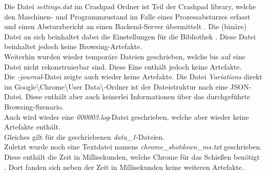 \begin{appendices}

Die Datei \textit{settings.dat} im Crashpad Ordner ist Teil der Crashpad library, welche den Maschinen- und Programmzustand im Falle eines Prozessabsturzes erfasst und einen Absturzbericht an einen Backend-Server übermittelt \cite{CrashpadOverviewDesign}. Die (binäre) Datei an sich beinhaltet dabei die Einstellungen für die Bibliothek \cite{CrashpadOverviewDesign}. Diese Datei beinhaltet jedoch keine Browsing-Artefakte. \\
Weiterhin wurden wieder temporäre Dateien geschrieben, welche bis auf eine Datei nicht rekonstruierbar sind. Diese Eine enthält jedoch keine Artefakte. \\
Die \textit{-journal}-Datei zeigte auch wieder keine Artefakte.
Die Datei \textit{Variations} direkt im Google\textbackslash{}Chrome\textbackslash{}User Data\textbackslash{}-Ordner ist der Dateistruktur nach eine JSON-Datei. Diese enthält aber auch keinerlei Informationen über das durchgeführte Browsing-Szenario.\\
Auch wird wieder eine \textit{000003.log}-Datei geschrieben, welche aber wieder keine Artefakte enthält.\\
Gleiches gilt für die geschriebenen \textit{data\_1}-Dateien.\\
Zuletzt wurde noch eine Textdatei namens \textit{chrome\_shotdown\_ms.txt} geschrieben. Diese enthält die Zeit in Millisekunden, welche Chrome für das Schießen benötigt \cite{ChromiumShutdownMSTxtWebpageDoku}. Dort fanden sich neben der Zeit in Millisekunden keine weiteren Artefakte.


\end{appendices}
